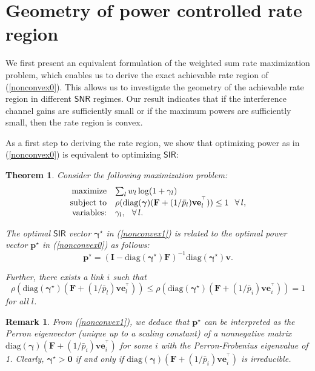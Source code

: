 \documentclass[10pt,twocolumn]{IEEEtran}
\newcommand{\0}{\mathbf{0}}
\newcommand{\1}{\mathbf{1}}
\newcommand{\trans}{^\top}
\newtheorem{theorem}{Theorem}
\newtheorem{remark}{Remark}
\begin{document}
\section{Geometry of power controlled rate region}
\label{wgtsumratesection}
We first present an equivalent formulation of the weighted sum rate maximization problem, which enables us to derive the exact achievable rate region of (\ref{nonconvex0}). This allows us to investigate the geometry of the achievable rate region in different $\mathsf{SNR}$ regimes. Our result indicates that if the interference channel gains are sufficiently small or if the maximum powers are sufficiently small, then the rate region is convex.

As a first step to deriving the rate region, we show that optimizing power as in (\ref{nonconvex0}) is equivalent to optimizing $\mathsf{SIR}$:
\begin{theorem}
\label{sumratetheorem}
Consider the following maximization problem:
\begin{equation}
\label{nonconvex1}
\begin{array}
[c]{rl}
\mbox{maximize} & \sum_l w_l \log(1+\gamma_l)\\
\mbox{subject to} &  \rho(\mbox{diag}(\boldsymbol{\gamma})(\mathbf{F}+(1/\bar{p}_l)\mathbf{v}\mathbf{e}^{\trans}_l)) \le 1 \,\;\; \forall \, l, \\
\mbox{variables:} & \gamma_l, \,\;\; \forall \, l.
\end{array}
\end{equation}

The optimal $\mathsf{SIR}$ vector $\boldsymbol{\gamma}^{\star}$ in (\ref{nonconvex1}) is related to the optimal power vector $\mathbf{p}^{\star}$ in (\ref{nonconvex0}) as follows:
\begin{equation}
\mathbf{p}^{\star} = \left( \mathbf{I} - \mbox{diag}(\boldsymbol{\gamma}^{\star})\mathbf{F} \right)^{-1} \mbox{diag}(\boldsymbol{\gamma}^{\star})\mathbf{v}.
\end{equation}

Further, there exists a link $i$ such that 
\begin{equation} 
\label{rhoequal1}
\rho(\mbox{diag}(\boldsymbol{\gamma}^{\star})(\mathbf{F}+(1/\bar{p}_l)\mathbf{v}\mathbf{e}^{\trans}_l)) \le \rho(\mbox{diag}(\boldsymbol{\gamma}^{\star})(\mathbf{F}+(1/\bar{p}_i)\mathbf{v}\mathbf{e}^{\trans}_i)) = 1
\end{equation} 
for all $l$. 
\end{theorem}

\begin{remark}
From (\ref{nonconvex1}), we deduce that $\mathbf{p}^{\star}$ can be interpreted as the Perron eigenvector (unique up to a scaling constant) of a nonnegative matrix $\mbox{diag}(\boldsymbol{\gamma})(\mathbf{F}+(1/\bar{p}_i)\mathbf{v}\mathbf{e}^{\trans}_i)$ for some $i$ with the Perron-Frobenius eigenvalue of 1. Clearly, $\boldsymbol{\gamma}^{\star} > \mathbf{0}$ if and only if $\mbox{diag}(\boldsymbol{\gamma})(\mathbf{F}+(1/\bar{p}_i)\mathbf{v}\mathbf{e}^{\trans}_i)$ is irreducible.
\end{remark}
\end{document}

